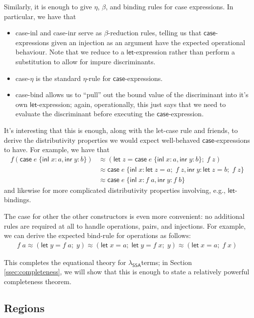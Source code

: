 \documentclass[acmsmall,screen,review]{acmart}
\newcommand{\ms}[1]{\ensuremath{\mathsf{#1}}}
\newcommand{\lto}{:}
\newcommand{\linl}[1]{\ms{inl}\;{#1}}
\newcommand{\linr}[1]{\ms{inr}\;{#1}}
\newcommand{\letexpr}[3]{\ensuremath{\ms{let}\;#1 = #2;\;#3}}
\newcommand{\caseexpr}[5]{\ms{case}\;#1\;\{\linl{#2} \lto #3, \linr{#4} \lto #5\}}
\newcommand{\teqv}{\approx}
\newcommand{\brle}[1]{{\scriptsize\textsf{#1}}}
\newcommand{\isotopessa}{\(\lambda_{\ms{SSA}}\)}
\begin{document}
Similarly, it is enough to give $\eta$, $\beta$, and binding rules for \brle{case} expressions. 
In particular, we have that
\begin{itemize}
  \item \brle{case-inl} and \brle{case-inr} serve as $\beta$-reduction rules, telling us that
  \ms{case}-expressions given an injection as an argument have the expected operational behaviour.
  Note that we reduce to a \ms{let}-expression rather than perform a substitution to allow for
  impure discriminants.
  \item \brle{case-$\eta$} is the standard $\eta$-rule for \ms{case}-expressions.
  \item \brle{case-bind} allows us to ``pull'' out the bound value of the discriminant into
  it's own \ms{let}-expression; again, operationally, this just says that we need to evaluate
  the discriminant before executing the \ms{case}-expression.
\end{itemize}
It's interesting that this is enough, along with the \brle{let-case} rule and friends, to derive the
distributivity properties we would expect well-behaved \ms{case}-expressions to have. For example,
we have that
\begin{align*}
  f(\caseexpr{e}{x}{a}{y}{b}) 
  &\teqv (\letexpr{z}{\caseexpr{e}{x}{a}{y}{b}}{f\;z}) \\
  &\teqv \caseexpr{e}{x}{\letexpr{z}{a}{f\;z}}{y}{\letexpr{z}{b}{f\;z}} \\
  &\teqv \caseexpr{e}{x}{f\;a}{y}{f\;b}
\end{align*}
and likewise for more complicated distributivity properties involving, e.g., \ms{let}-bindings.

The case for other the other constructors is even more convenient: no additional rules are required
at all to handle operations, pairs, and injections. For example, we can derive the expected
bind-rule for operations as follows:
\begin{align*}
  f\;a \teqv (\letexpr{y}{f\;a}{y})
  \teqv (\letexpr{x}{a}{\letexpr{y}{f\;x}{y}})
  \teqv (\letexpr{x}{a}{f\;x})
\end{align*}

This completes the equational theory for \isotopessa terms; in Section \ref{ssec:completeness}, we
will show that this is enough to state a relatively powerful completeness theorem.

\subsection{Regions}
\end{document}
